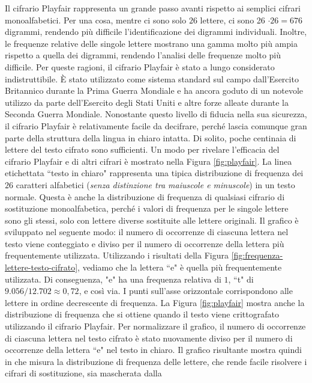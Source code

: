 Il cifrario Playfair rappresenta un grande passo avanti rispetto ai semplici cifrari monoalfabetici.
Per una cosa, mentre ci sono solo $26$ lettere, ci sono 26 $\cdot 26 = 676$ digrammi, rendendo
più difficile l'identificazione dei digrammi individuali. Inoltre, le frequenze relative delle singole
lettere mostrano una gamma molto più ampia rispetto a quella dei digrammi, rendendo l'analisi delle
frequenze molto più difficile. Per queste ragioni, il cifrario Playfair è stato a lungo considerato
indistruttibile. È stato utilizzato come sistema standard sul campo dall'Esercito Britannico durante
la Prima Guerra Mondiale e ha ancora goduto di un notevole utilizzo da parte dell'Esercito degli Stati
Uniti e altre forze alleate durante la Seconda Guerra Mondiale.
Nonostante questo livello di fiducia nella sua sicurezza, il cifrario Playfair è relativamente facile
da decifrare, perché lascia comunque gran parte della struttura della lingua in chiaro intatta. Di solito,
poche centinaia di lettere del testo cifrato sono sufficienti.
Un modo per rivelare l'efficacia del cifrario Playfair e di altri cifrari è mostrato nella Figura \ref{fig:playfair}.
La linea etichettata ``testo in chiaro" rappresenta una tipica distribuzione di frequenza dei $26$ caratteri
alfabetici (\textit{senza distinzione tra maiuscole e minuscole}) in un testo normale. Questa è anche la
distribuzione di frequenza di qualsiasi cifrario di sostituzione monoalfabetica, perché i valori di
frequenza per le singole lettere sono gli stessi, solo con lettere diverse sostituite alle lettere
originali. Il grafico è sviluppato nel seguente modo: il numero di occorrenze di ciascuna lettera nel
testo viene conteggiato e diviso per il numero di occorrenze della lettera più frequentemente utilizzata.
Utilizzando i risultati della Figura \ref{fig:frequenza-lettere-testo-cifrato}, vediamo che la
lettera ``e" è quella più frequentemente utilizzata.
Di conseguenza, "e" ha una frequenza relativa di $1$, ``t" di $9.056/12.702 \approx 0,72$, e così via.
I punti sull'asse orizzontale corrispondono alle lettere in ordine decrescente di frequenza.
La Figura \ref{fig:playfair} mostra anche la distribuzione di frequenza che si ottiene quando il testo viene
crittografato utilizzando il cifrario Playfair. Per normalizzare il grafico, il numero di occorrenze
di ciascuna lettera nel testo cifrato è stato nuovamente diviso per il numero di occorrenze della
lettera ``e" nel testo in chiaro. Il grafico risultante mostra quindi in che misura la distribuzione
di frequenza delle lettere, che rende facile risolvere i cifrari di sostituzione, sia mascherata dalla
